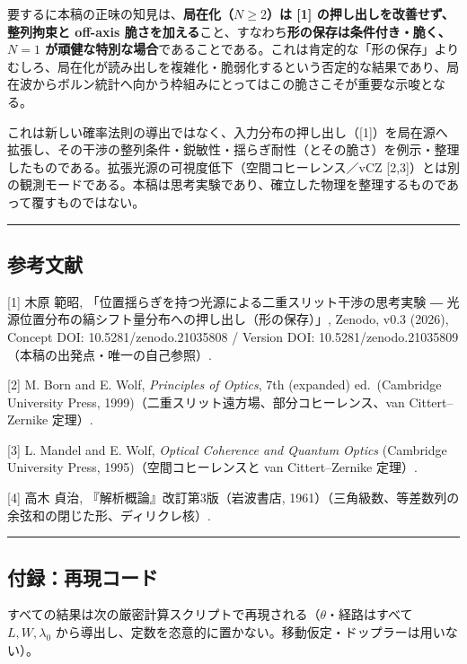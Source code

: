 \documentclass[
]{ltjsarticle}
\begin{document}
要するに本稿の正味の知見は、\textbf{局在化（\(N\ge2\)）は {[}1{]}
の押し出しを改善せず、整列拘束と off-axis
脆さを加える}こと、すなわち\textbf{形の保存は条件付き・脆く、\(N=1\)
が頑健な特別な場合}であることである。これは肯定的な「形の保存」よりむしろ、局在化が読み出しを複雑化・脆弱化するという否定的な結果であり、局在波からボルン統計へ向かう枠組みにとってはこの脆さこそが重要な示唆となる。

これは新しい確率法則の導出ではなく、入力分布の押し出し（{[}1{]}）を局在源へ拡張し、その干渉の整列条件・鋭敏性・揺らぎ耐性（とその脆さ）を例示・整理したものである。拡張光源の可視度低下（空間コヒーレンス／vCZ
{[}2,3{]}）とは別の観測モードである。本稿は思考実験であり、確立した物理を整理するものであって覆すものではない。

\begin{center}\rule{0.5\linewidth}{0.5pt}\end{center}

\subsection{参考文献}\label{ux53c2ux8003ux6587ux732e}

{[}1{]} 木原 範昭,
「位置揺らぎを持つ光源による二重スリット干渉の思考実験 ―
光源位置分布の縞シフト量分布への押し出し（形の保存）」, Zenodo, v0.3
(2026), Concept DOI: 10.5281/zenodo.21035808 / Version DOI:
10.5281/zenodo.21035809（本稿の出発点・唯一の自己参照）.

{[}2{]} M. Born and E. Wolf, \emph{Principles of Optics}, 7th (expanded)
ed.~(Cambridge University Press,
1999)（二重スリット遠方場、部分コヒーレンス、van Cittert--Zernike
定理）.

{[}3{]} L. Mandel and E. Wolf, \emph{Optical Coherence and Quantum
Optics} (Cambridge University Press, 1995)（空間コヒーレンスと van
Cittert--Zernike 定理）.

{[}4{]} 高木 貞治, 『解析概論』改訂第3版（岩波書店,
1961）（三角級数、等差数列の余弦和の閉じた形、ディリクレ核）.

\begin{center}\rule{0.5\linewidth}{0.5pt}\end{center}

\subsection{付録：再現コード}\label{ux4ed8ux9332ux518dux73feux30b3ux30fcux30c9}

すべての結果は次の厳密計算スクリプトで再現される（\(\theta\)・経路はすべて
\(L,W,\lambda_0\)
から導出し、定数を恣意的に置かない。移動仮定・ドップラーは用いない）。
\end{document}
